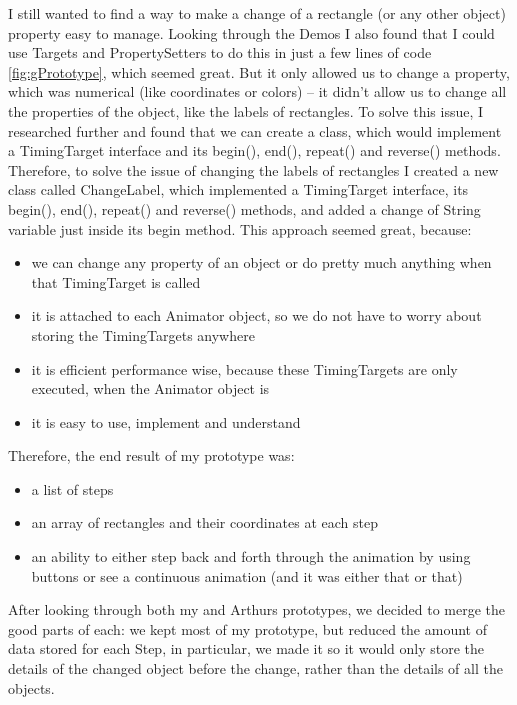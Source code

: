 \documentclass{l3proj}
\begin{document}
I still wanted to find a way to make a change of a rectangle (or any other object) property easy to manage. Looking through the Demos I also found that I could use Targets and PropertySetters to do this in just a few lines of code \ref{fig:gPrototype}, which seemed great. But it only allowed us to change a property, which was numerical (like coordinates or colors) – it didn’t allow us to change all the properties of the object, like the labels of rectangles. To solve this issue, I researched further and found that we can create a class, which would implement a TimingTarget interface and its begin(), end(), repeat() and reverse() methods. Therefore, to solve the issue of changing the labels of rectangles I created a new class called ChangeLabel, which implemented a TimingTarget interface, its begin(), end(), repeat() and reverse() methods, and added a change of String variable just inside its begin method. This approach seemed great, because:
\begin{itemize}
	\item we can change any property of an object or do pretty much anything when that TimingTarget is called
	\item it is attached to each Animator object, so we do not have to worry about storing the TimingTargets anywhere
	\item it is efficient performance wise, because these TimingTargets are only executed, when the Animator object is
	\item it is easy to use, implement and understand
\end{itemize}

Therefore, the end result of my prototype was:
\begin{itemize}
	\item a list of steps
	\item an array of rectangles and their coordinates at each step
	\item an ability to either step back and forth through the animation by using buttons or see a continuous animation (and it was either that or that)
\end{itemize}

After looking through both my and Arthurs prototypes, we decided to merge the good parts of each: we kept most of my prototype, but reduced the amount of data stored for each Step, in particular, we made it so it would only store the details of the changed object before the change, rather than the details of all the objects.
\end{document}
